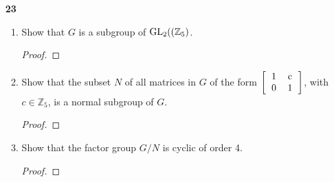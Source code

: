 \documentclass[paper=usletter, fontsize=12pt]{article}
\begin{document}
\begin{itemize}
\begin{enumerate}
            \item[\textbf{23}]
            \begin{enumerate}

                \item Show that $G$ is a subgroup of $\text{GL}_2((\mathbb{Z}_5)$.
                \begin{proof}
                \end{proof}

                \item Show that the subset $N$ of all matrices in $G$ of the form $\left[\begin{tabular}{cc}
                            1 & c \\
                            0 & 1
                \end{tabular}\right]$, with $c \in \mathbb{Z}_5$, is a normal
                subgroup of $G$.
                \begin{proof}
                \end{proof}

                \item Show that the factor group $G/N$ is cyclic of order 4.
                \begin{proof}
                \end{proof}

            \end{enumerate}

        \end{enumerate}


    \end{itemize}
\end{document}
